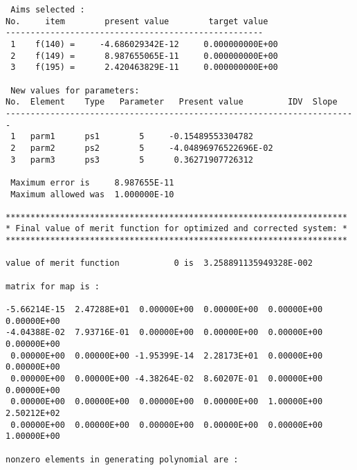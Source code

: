 \begin{footnotesize}
\begin{verbatim}
 Aims selected :
No.     item        present value        target value
----------------------------------------------------
 1    f(140) =     -4.686029342E-12     0.000000000E+00
 2    f(149) =      8.987655065E-11     0.000000000E+00
 3    f(195) =      2.420463829E-11     0.000000000E+00

 New values for parameters:
No.  Element    Type   Parameter   Present value         IDV  Slope
-----------------------------------------------------------------------
 1   parm1      ps1        5     -0.15489553304782
 2   parm2      ps2        5     -4.04896976522696E-02
 3   parm3      ps3        5      0.36271907726312

 Maximum error is     8.987655E-11
 Maximum allowed was  1.000000E-10

*********************************************************************
* Final value of merit function for optimized and corrected system: *
*********************************************************************

value of merit function           0 is  3.258891135949328E-002

matrix for map is :

-5.66214E-15  2.47288E+01  0.00000E+00  0.00000E+00  0.00000E+00  0.00000E+00
-4.04388E-02  7.93716E-01  0.00000E+00  0.00000E+00  0.00000E+00  0.00000E+00
 0.00000E+00  0.00000E+00 -1.95399E-14  2.28173E+01  0.00000E+00  0.00000E+00
 0.00000E+00  0.00000E+00 -4.38264E-02  8.60207E-01  0.00000E+00  0.00000E+00
 0.00000E+00  0.00000E+00  0.00000E+00  0.00000E+00  1.00000E+00  2.50212E+02
 0.00000E+00  0.00000E+00  0.00000E+00  0.00000E+00  0.00000E+00  1.00000E+00

nonzero elements in generating polynomial are :


\end{verbatim}
\end{footnotesize}
